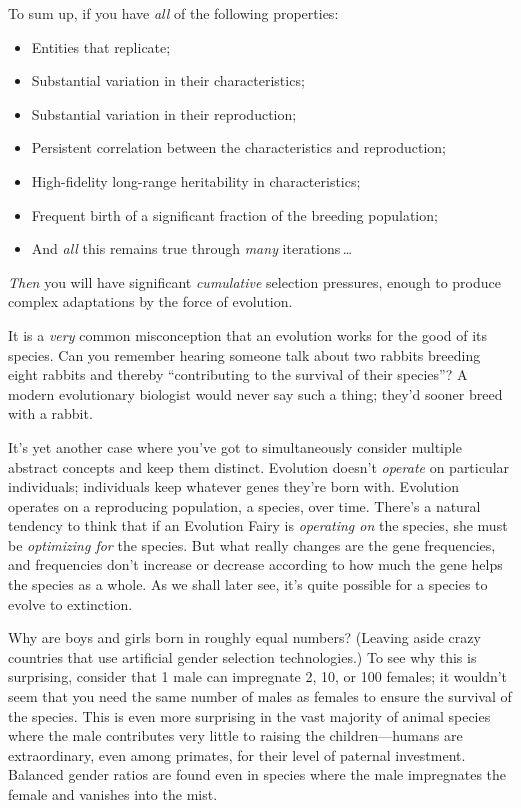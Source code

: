  To sum up, if you have \textit{all} of the following properties:

\begin{itemize}
\item  Entities that replicate;
\item  Substantial variation in their characteristics;
\item  Substantial variation in their reproduction;
\item Persistent correlation between the characteristics and
reproduction;
\item  High-fidelity long-range heritability in characteristics;
\item  Frequent birth of a significant fraction of the breeding
  population;
\item And \textit{all} this remains true through \textit{many}
  iterations\,\ldots
\end{itemize}


 \textit{Then} you will have significant \textit{cumulative}
selection pressures, enough to produce complex adaptations by the force
of evolution.

\myendsectiontext



 It is a \textit{very} common misconception that an evolution works
for the good of its species. Can you remember hearing someone talk
about two rabbits breeding eight rabbits and thereby
``contributing to the survival of their
species''? A modern evolutionary biologist would
never say such a thing; they'd sooner breed with a
rabbit. 


 It's yet another case where you've
got to simultaneously consider multiple abstract concepts and keep them
distinct. Evolution doesn't \textit{operate} on
particular individuals; individuals keep whatever genes
they're born with. Evolution operates on a reproducing
population, a species, over time. There's a natural
tendency to think that if an Evolution Fairy is \textit{operating on}
the species, she must be \textit{optimizing for} the species. But what
really changes are the gene frequencies, and frequencies
don't increase or decrease according to how much the
gene helps the species as a whole. As we shall later see,
it's quite possible for a species to evolve to
extinction.


 Why are boys and girls born in roughly equal numbers? (Leaving
aside crazy countries that use artificial gender selection
technologies.) To see why this is surprising, consider that 1 male can
impregnate 2, 10, or 100 females; it wouldn't seem that
you need the same number of males as females to ensure the survival of
the species. This is even more surprising in the vast majority of
animal species where the male contributes very little to raising the
children---humans are extraordinary, even among primates, for their
level of paternal investment. Balanced gender ratios are found even in
species where the male impregnates the female and vanishes into the
mist.


